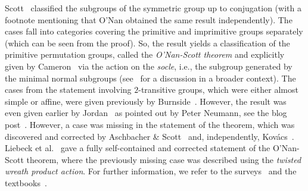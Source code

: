 Scott~\cite[p.~329]{Scott80} 
classified the subgroups of the symmetric group up to conjugation
(with a footnote mentioning that O'Nan obtained
the same result independently). The cases fall into categories covering the primitive and imprimitive groups separately (which can be seen from the proof).
So, the result yields a classification
of the primitive permutation groups, called the \emph{O'Nan-Scott theorem} 
and explicitly given by Cameron~\cite[Thm.~4.1]{cameron81} via the action
on the \emph{socle}, i.e., the subgroup generated by the minimal normal subgroups (see~\cite[Sect.~8]{cameron81} for a discussion in a broader context). 
The cases from the statement 
involving $2$-transitive groups, which were either almost simple or affine,
were given previously by Burnside~\cite{burnside1911}. However, the result was even given
earlier by Jordan~\cite{jordan1870} as pointed out by Peter Neumann, 
see the blog post~\cite{cameron:blog}.
However, a case was missing in the statement of the theorem, which was discovered 
and corrected by Aschbacher \& Scott~\cite{ASCHBACHER1985} and, independently, Kov\'acs~\cite{KOVACS1986114}.
Liebeck et al.~\cite{Liebeck88} gave a fully self-contained
and corrected statement of the O'Nan-Scott theorem, where the previously missing
case was described using the \emph{twisted wreath product action}.
For further information, we refer to the surveys~\cite{cameron81,praeger90}
and the textbooks~\cite{cameron_1999,dixon1996permutation}.